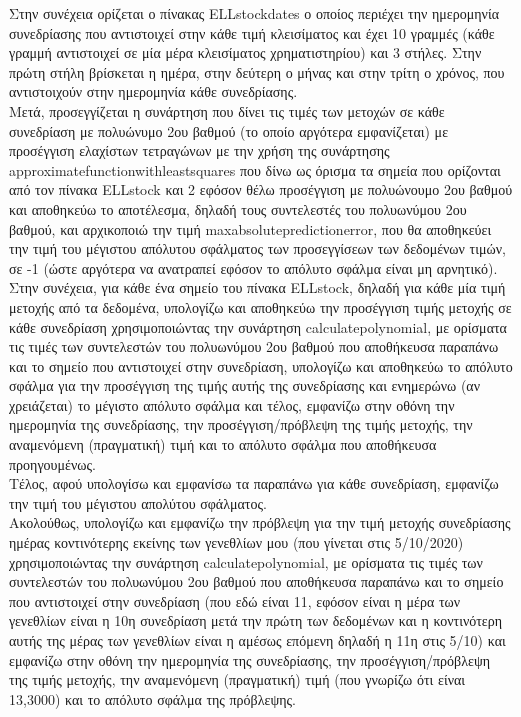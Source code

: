 \documentclass[a4paper,11pt]{article}
\newcommand{\lt}{\latintext}
\begin{document}
Στην συνέχεια ορίζεται ο πίνακας {\lt ELL\textunderscore stock\textunderscore dates} ο οποίος περιέχει την ημερομηνία συνεδρίασης που αντιστοιχεί στην κάθε τιμή κλεισίματος και έχει 10 γραμμές (κάθε γραμμή αντιστοιχεί σε μία μέρα κλεισίματος χρηματιστηρίου) και 3 στήλες. Στην πρώτη στήλη βρίσκεται η ημέρα, στην δεύτερη ο μήνας και στην τρίτη ο χρόνος, που αντιστοιχούν στην ημερομηνία κάθε συνεδρίασης.\\

Μετά, προσεγγίζεται η συνάρτηση που δίνει τις τιμές των μετοχών σε κάθε συνεδρίαση με πολυώνυμο 2ου βαθμού (το οποίο αργότερα εμφανίζεται) με προσέγγιση ελαχίστων τετραγώνων με την χρήση της συνάρτησης {\lt approximate\textunderscore function\textunderscore with\textunderscore least\textunderscore squares} που δίνω ως όρισμα τα σημεία που ορίζονται από τον πίνακα {\lt ELL\textunderscore stock} και 2 εφόσον θέλω προσέγγιση με πολυώνουμο 2ου βαθμού και αποθηκεύω το αποτέλεσμα, δηλαδή τους συντελεστές του πολυωνύμου 2ου βαθμού, και αρχικοποιώ την τιμή {\lt max\textunderscore absolute\textunderscore prediction\textunderscore error}, που θα αποθηκεύει την τιμή του μέγιστου απόλυτου σφάλματος των προσεγγίσεων των δεδομένων τιμών, σε -1 (ώστε αργότερα να ανατραπεί εφόσον το απόλυτο σφάλμα είναι μη αρνητικό).\\

Στην συνέχεια, για κάθε ένα σημείο του πίνακα {\lt ELL\textunderscore stock}, δηλαδή για κάθε μία τιμή μετοχής από τα δεδομένα, υπολογίζω και αποθηκεύω την προσέγγιση τιμής μετοχής σε κάθε συνεδρίαση χρησιμοποιώντας την συνάρτηση {\lt calculate\textunderscore polynomial}, με ορίσματα τις τιμές των συντελεστών του πολυωνύμου 2ου βαθμού που αποθήκευσα παραπάνω και το σημείο που αντιστοιχεί στην συνεδρίαση, υπολογίζω και αποθηκεύω το απόλυτο σφάλμα για την προσέγγιση της τιμής αυτής της συνεδρίασης και ενημερώνω (αν χρειάζεται) το μέγιστο απόλυτο σφάλμα και τέλος, εμφανίζω στην οθόνη την ημερομηνία της συνεδρίασης, την προσέγγιση/πρόβλεψη της τιμής μετοχής, την αναμενόμενη (πραγματική) τιμή και το απόλυτο σφάλμα που αποθήκευσα προηγουμένως.\\
Τέλος, αφού υπολογίσω και εμφανίσω τα παραπάνω για κάθε συνεδρίαση, εμφανίζω την τιμή του μέγιστου απολύτου σφάλματος.\\

Ακολούθως, υπολογίζω και εμφανίζω την πρόβλεψη για την τιμή μετοχής συνεδρίασης ημέρας κοντινότερης εκείνης των γενεθλίων μου (που γίνεται στις 5/10/2020) χρησιμοποιώντας την συνάρτηση {\lt calculate\textunderscore polynomial}, με ορίσματα τις τιμές των συντελεστών του πολυωνύμου 2ου βαθμού που αποθήκευσα παραπάνω και το σημείο που αντιστοιχεί στην συνεδρίαση (που εδώ είναι 11, εφόσον είναι η μέρα των γενεθλίων είναι η 10η συνεδρίαση μετά την πρώτη των δεδομένων και η κοντινότερη αυτής της μέρας των γενεθλίων είναι η αμέσως επόμενη δηλαδή η 11η στις 5/10) και εμφανίζω στην οθόνη την ημερομηνία της συνεδρίασης, την προσέγγιση/πρόβλεψη της τιμής μετοχής, την αναμενόμενη (πραγματική) τιμή (που γνωρίζω ότι είναι 13,3000) και το απόλυτο σφάλμα της πρόβλεψης.\\
\end{document}
